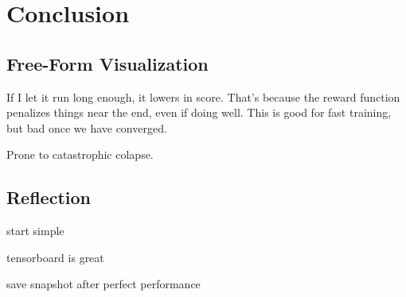 \documentclass[12pt,a4paper]{article}
\begin{document}
\section{Conclusion}
%
\subsection*{Free-Form Visualization}
%
If I let it run long enough, it lowers in score. That's because the reward function penalizes things near the end, even if doing well. This is good for fast training, but bad once we have converged.

Prone to catastrophic colapse.
\subsection*{Reflection}
start simple

tensorboard is great

save snapshot after perfect performance
\end{document}
